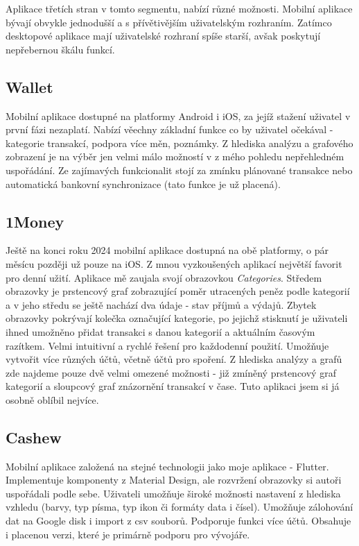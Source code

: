 \documentclass[
  biblatex,
  figures=false,
  tables=false,
  glossaries,
  index
]{kidiplom}
\begin{document}
Aplikace třetích stran v tomto segmentu, nabízí různé možnosti. Mobilní aplikace bývají obvykle jednodušší a s přívětivějším uživatelským rozhraním. Zatímco desktopové aplikace mají uživatelské rozhraní spíše starší, avšak poskytují nepřebernou škálu funkcí.

\subsection{Wallet}
Mobilní aplikace dostupné na platformy Android i iOS, za jejíž stažení uživatel v první fázi nezaplatí. Nabízí věechny základní funkce co by uživatel očekával - kategorie transakcí, podpora více měn, poznámky. Z hlediska analýzu a grafového zobrazení je na výběr jen velmi málo možností v z mého pohledu nepřehledném uspořádání. Ze zajímavých funkcionalit stojí za zmínku plánované transakce nebo automatická bankovní synchronizace (tato funkce je už placená).

\subsection{1Money}
Ještě na konci roku 2024 mobilní aplikace dostupná na obě platformy, o pár měsícu později už pouze na iOS. Z mnou vyzkoušených aplikací největší favorit pro denní užití. Aplikace mě zaujala svojí obrazovkou \textit{Categories}.  Středem obrazovky je prstencový graf zobrazující poměr utracených peněz podle kategorií a v jeho středu se ještě nachází dva údaje - stav příjmů a výdajů. Zbytek obrazovky pokrývají kolečka označující kategorie, po jejichž stisknutí je uživateli ihned umožněno přidat transakci s danou kategorií a aktuálním časovým razítkem. Velmi intuitivní a rychlé řešení pro každodenní použití. Umožňuje vytvořit více různých účtů, včetně účtů pro spoření. Z hlediska analýzy a grafů zde najdeme pouze dvě velmi omezené možnosti - již zmíněný prstencový graf kategorií a sloupcový graf znázornění transakcí v čase. Tuto aplikaci jsem si já osobně oblíbil nejvíce.

\subsection{Cashew}
Mobilní aplikace založená na stejné technologii jako moje aplikace - Flutter. Implementuje komponenty z Material Design, ale rozvržení obrazovky si autoři uspořádali podle sebe. Uživateli umožňuje široké možnosti nastavení z hlediska vzhledu (barvy, typ písma, typ ikon či formáty data i čísel). Umožňuje zálohování dat na Google disk i import z csv souborů. Podporuje funkci více účtů. Obsahuje i placenou verzi, které je primárně podporu pro vývojáře.
\end{document}
